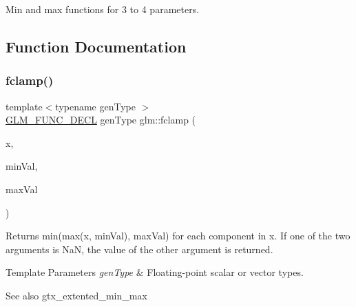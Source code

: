 Min and max functions for 3 to 4 parameters. 

\subsection{Function Documentation}
\mbox{\label{group__gtx__extended__min__max_ga1e28539d3a46965ed9ef92ec7cb3b18a}} 
\subsubsection{\texorpdfstring{fclamp()}{fclamp()}\hspace{0.1cm}{\footnotesize\ttfamily [1/3]}}
{\footnotesize\ttfamily template$<$typename gen\+Type $>$ \\
\hyperlink{setup_8hpp_ab2d052de21a70539923e9bcbf6e83a51}{G\+L\+M\+\_\+\+F\+U\+N\+C\+\_\+\+D\+E\+CL} gen\+Type glm\+::fclamp (\begin{DoxyParamCaption}\item[{gen\+Type}]{x,  }\item[{gen\+Type}]{min\+Val,  }\item[{gen\+Type}]{max\+Val }\end{DoxyParamCaption})}

Returns min(max(x, min\+Val), max\+Val) for each component in x. If one of the two arguments is NaN, the value of the other argument is returned.


\begin{DoxyTemplParams}{Template Parameters}
{\em gen\+Type} & Floating-\/point scalar or vector types.\\
\hline
\end{DoxyTemplParams}
\begin{DoxySeeAlso}{See also}
gtx\+\_\+extented\+\_\+min\+\_\+max 
\end{DoxySeeAlso}
\mbox{\label{group__gtx__extended__min__max_ga60796d08903489ee185373593bc16b9d}} 
